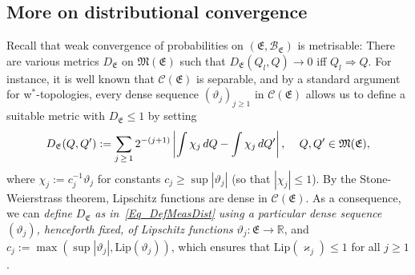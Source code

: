 \documentclass[AHL,Unicode,longabstracts]{cedram}
\newcommand{\clC}{\mathcal{C}}
\newcommand{\clB}{\mathcal{B}}
\newcommand{\Lip}{\mathrm{Lip}}
\newcommand{\frkE}{\mathfrak{E}}
\newcommand{\frkM}{\mathfrak{M}}
\newcommand{\bbR}{\mathbb{R}}
\begin{document}
\subsection{More on distributional convergence}
Recall that weak convergence of probabilities on $(\frkE,\clB_{\frkE})$ is metrisable: There are various metrics $D_{\frkE}$ on $\frkM(\frkE)$ such that $D_{\frkE}(Q_{l},Q)\rightarrow0$ iff $Q_{l}\Longrightarrow Q$. For instance, it is well known that $\clC(\frkE)$ is separable, and by a standard argument for w$^{\ast}$-topologies, every dense sequence $(\vartheta_{j})_{j\geq1}$ in $\clC(\frkE)$ allows us to define a suitable metric with $D_{\frkE}\leq1$ by setting
\begin{equation}\label{Eq_DefMeasDist}
D_{\frkE}(Q,Q^{\prime}):=\sum_{j\,\geq\,1}2^{-(j+1)}\left\vert \int\chi _{j}\,dQ-\int\chi_{j}\,dQ^{\prime}\right\vert \text{, \quad}Q,Q^{\prime}
\in\frkM(\frkE),
\end{equation}
where $\chi_{j}:=c_{j}^{-1}\vartheta_{j}$ for constants $c_{j}\geq
\sup\left\vert \vartheta_{j}\right\vert $ (so that $\left\vert \chi _{j}\right\vert \leq1$). By the Stone-Weierstrass theorem, Lipschitz functions are dense in $\clC(\frkE)$. As a consequence, we can
\emph{define} $D_{\frkE}$ \emph{as in~\eqref{Eq_DefMeasDist}}
\emph{using a particular dense sequence }$(\vartheta_{j})$\emph{, henceforth fixed, of Lipschitz functions} $\vartheta_{j}:\frkE\rightarrow
\bbR$, and $c_{j}:=\max(\sup\left\vert \vartheta_{j}\right\vert,\Lip(\vartheta_{j}))$, which ensures that $\Lip(\varkappa _{j})\leq1$ for all $j\geq1$.
\end{document}
